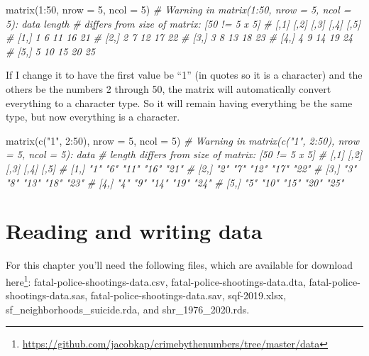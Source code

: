 \documentclass[
]{krantz}
\makeatletter
\newenvironment{Shaded}{\begin{snugshade}}{\end{snugshade}}
\newcommand{\AttributeTok}[1]{\textcolor[rgb]{0.61,0.61,0.61}{#1}}
\newcommand{\CommentTok}[1]{\textcolor[rgb]{0.37,0.37,0.37}{\textit{#1}}}
\newcommand{\DecValTok}[1]{\textcolor[rgb]{0.06,0.06,0.06}{#1}}
\newcommand{\FunctionTok}[1]{\textcolor[rgb]{0,0,0}{#1}}
\newcommand{\NormalTok}[1]{#1}
\newcommand{\SpecialCharTok}[1]{\textcolor[rgb]{0,0,0}{#1}}
\newcommand{\StringTok}[1]{\textcolor[rgb]{0.5,0.5,0.5}{#1}}
\renewcommand{\href}[2]{#2\footnote{\url{#1}}}
\newenvironment{kframe}{%
\medskip{}
\setlength{\fboxsep}{.8em}
 \def\at@end@of@kframe{}%
 \ifinner\ifhmode%
  \def\at@end@of@kframe{\end{minipage}}%
  \begin{minipage}{\columnwidth}%
 \fi\fi%
 \def\FrameCommand##1{\hskip\@totalleftmargin \hskip-\fboxsep
 \colorbox{shadecolor}{##1}\hskip-\fboxsep
     \hskip-\linewidth \hskip-\@totalleftmargin \hskip\columnwidth}%
 \MakeFramed {\advance\hsize-\width
   \@totalleftmargin\z@ \linewidth\hsize
   \@setminipage}}%
 {\par\unskip\endMakeFramed%
 \at@end@of@kframe}
\renewenvironment{Shaded}{\begin{kframe}}{\end{kframe}}
\makeatother
\begin{document}
\begin{Shaded}
\begin{Highlighting}[]
\FunctionTok{matrix}\NormalTok{(}\DecValTok{1}\SpecialCharTok{:}\DecValTok{50}\NormalTok{, }\AttributeTok{nrow =} \DecValTok{5}\NormalTok{, }\AttributeTok{ncol =} \DecValTok{5}\NormalTok{)}
\CommentTok{\# Warning in matrix(1:50, nrow = 5, ncol = 5): data length}
\CommentTok{\# differs from size of matrix: [50 != 5 x 5]}
\CommentTok{\#      [,1] [,2] [,3] [,4] [,5]}
\CommentTok{\# [1,]    1    6   11   16   21}
\CommentTok{\# [2,]    2    7   12   17   22}
\CommentTok{\# [3,]    3    8   13   18   23}
\CommentTok{\# [4,]    4    9   14   19   24}
\CommentTok{\# [5,]    5   10   15   20   25}
\end{Highlighting}
\end{Shaded}

If I change it to have the first value be ``1'' (in quotes
so it is a character) and the others be the numbers 2
through 50, the matrix will automatically convert everything
to a character type. So it will remain having everything be
the same type, but now everything is a character.

\begin{Shaded}
\begin{Highlighting}[]
\FunctionTok{matrix}\NormalTok{(}\FunctionTok{c}\NormalTok{(}\StringTok{"1"}\NormalTok{, }\DecValTok{2}\SpecialCharTok{:}\DecValTok{50}\NormalTok{), }\AttributeTok{nrow =} \DecValTok{5}\NormalTok{, }\AttributeTok{ncol =} \DecValTok{5}\NormalTok{)}
\CommentTok{\# Warning in matrix(c("1", 2:50), nrow = 5, ncol = 5): data}
\CommentTok{\# length differs from size of matrix: [50 != 5 x 5]}
\CommentTok{\#      [,1] [,2] [,3] [,4] [,5]}
\CommentTok{\# [1,] "1"  "6"  "11" "16" "21"}
\CommentTok{\# [2,] "2"  "7"  "12" "17" "22"}
\CommentTok{\# [3,] "3"  "8"  "13" "18" "23"}
\CommentTok{\# [4,] "4"  "9"  "14" "19" "24"}
\CommentTok{\# [5,] "5"  "10" "15" "20" "25"}
\end{Highlighting}
\end{Shaded}

\hypertarget{reading-and-writing-data}{%
\chapter{Reading and writing
data}\label{reading-and-writing-data}}

For this chapter you'll need the following files, which are
available for download
\href{https://github.com/jacobkap/crimebythenumbers/tree/master/data}{here}:
fatal-police-shootings-data.csv,
fatal-police-shootings-data.dta,
fatal-police-shootings-data.sas,
fatal-police-shootings-data.sav, sqf-2019.xlsx,
sf\_neighborhoods\_suicide.rda, and shr\_1976\_2020.rds.
\end{document}
